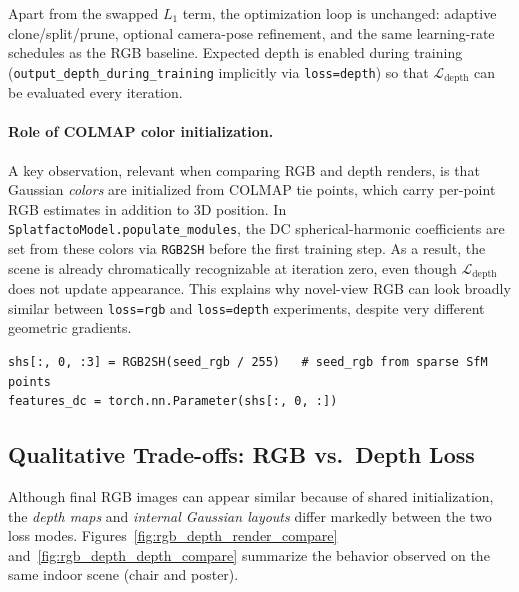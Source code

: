 \documentclass{report}
\newcommand{\filepath}[1]{\nolinkurl{#1}}
\begin{document}
Apart from the swapped $L_1$ term, the optimization loop is unchanged: adaptive clone/split/prune, optional camera-pose refinement, and the same learning-rate schedules as the RGB baseline. Expected depth is enabled during training (\texttt{output\_depth\_during\_training} implicitly via \texttt{loss=depth}) so that $\mathcal{L}_{\mathrm{depth}}$ can be evaluated every iteration.

\paragraph{Role of COLMAP color initialization.}
A key observation, relevant when comparing RGB and depth renders, is that Gaussian \emph{colors} are initialized from COLMAP tie points, which carry per-point RGB estimates in addition to 3D position. In \texttt{SplatfactoModel.populate\_modules}, the DC spherical-harmonic coefficients are set from these colors via \texttt{RGB2SH} before the first training step. As a result, the scene is already chromatically recognizable at iteration zero, even though $\mathcal{L}_{\mathrm{depth}}$ does not update appearance. This explains why novel-view RGB can look broadly similar between \texttt{loss=rgb} and \texttt{loss=depth} experiments, despite very different geometric gradients.

\begin{lstlisting}[caption={Color initialization from COLMAP seed points (\filepath{splatfacto.py}).},label={lst:colmap_color_init}]
shs[:, 0, :3] = RGB2SH(seed_rgb / 255)   # seed_rgb from sparse SfM points
features_dc = torch.nn.Parameter(shs[:, 0, :])
\end{lstlisting}

\subsection{Qualitative Trade-offs: RGB vs.\ Depth Loss}
\label{subsec:depth_rgb_tradeoff}

Although final RGB images can appear similar because of shared initialization, the \emph{depth maps} and \emph{internal Gaussian layouts} differ markedly between the two loss modes. Figures~\ref{fig:rgb_depth_render_compare} and~\ref{fig:rgb_depth_depth_compare} summarize the behavior observed on the same indoor scene (chair and poster).
\end{document}
